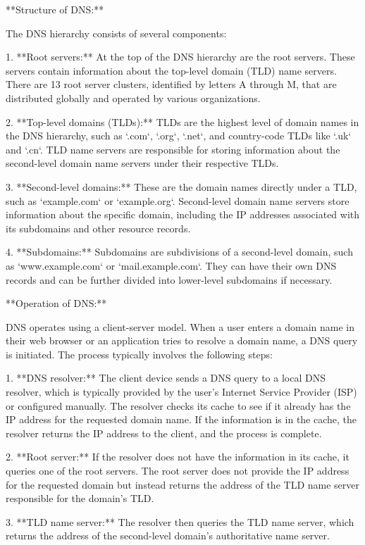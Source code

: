 \documentclass{article}
\begin{document}
**Structure of DNS:**

The DNS hierarchy consists of several components:

1. **Root servers:** At the top of the DNS hierarchy are the root servers. These servers contain information about the top-level domain (TLD) name servers. There are 13 root server clusters, identified by letters A through M, that are distributed globally and operated by various organizations.

2. **Top-level domains (TLDs):** TLDs are the highest level of domain names in the DNS hierarchy, such as `.com`, `.org`, `.net`, and country-code TLDs like `.uk` and `.cn`. TLD name servers are responsible for storing information about the second-level domain name servers under their respective TLDs.

3. **Second-level domains:** These are the domain names directly under a TLD, such as `example.com` or `example.org`. Second-level domain name servers store information about the specific domain, including the IP addresses associated with its subdomains and other resource records.

4. **Subdomains:** Subdomains are subdivisions of a second-level domain, such as `www.example.com` or `mail.example.com`. They can have their own DNS records and can be further divided into lower-level subdomains if necessary.

**Operation of DNS:**

DNS operates using a client-server model. When a user enters a domain name in their web browser or an application tries to resolve a domain name, a DNS query is initiated. The process typically involves the following steps:

1. **DNS resolver:** The client device sends a DNS query to a local DNS resolver, which is typically provided by the user's Internet Service Provider (ISP) or configured manually. The resolver checks its cache to see if it already has the IP address for the requested domain name. If the information is in the cache, the resolver returns the IP address to the client, and the process is complete.

2. **Root server:** If the resolver does not have the information in its cache, it queries one of the root servers. The root server does not provide the IP address for the requested domain but instead returns the address of the TLD name server responsible for the domain's TLD.

3. **TLD name server:** The resolver then queries the TLD name server, which returns the address of the second-level domain's authoritative name server.
\end{document}
